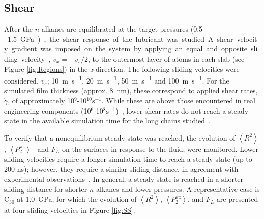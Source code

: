 \documentclass[5p]{elsarticle}
\begin{document}
\subsection{Shear}

After the $n$-alkanes are equilibrated at the target pressures (\SI{0.5}-\SI{1.5}{\giga\pascal}), the shear response of the lubricant was studied. A shear velocity gradient was imposed on the system by applying an equal and opposite sliding velocity, $v_x = \pm v_s/2$, to the outermost layer of atoms in each slab (see Figure \ref{fig:Regions}) in the \emph{x} direction. The following sliding velocities were considered, $v_s$; \SI{10}{\meter\per\second}, \SI{20}{\meter\per\second}, \SI{50}{\meter\per\second} and \SI{100}{\meter\per\second}. For the simulated film thickness (approx. \SI{8}{\nano\meter}), these correspond to applied shear rates, $\dot{\gamma}$, of approximately 10$^{9}$-10$^{10} \text{s}^{-1}$. While these are above those encountered in real engineering components (10$^{6}$-10$^{8} \text{s}^{-1}$)~\cite{Taylor2017}, lower shear rates do not reach a steady state in the available simulation time for the long chains studied~\cite{Ewen2018}.

To verify that a nonequilibrium steady state was reached, the evolution of $\left< R^2 \right>$, $\left<P_{2}^{xz} \right>$~\cite{Erman1985} and $F_L$ on the surfaces in response to the fluid, were monitored. Lower sliding velocities require a longer simulation time to reach a steady state (up to 200 ns); however, they require a similar sliding distance, in agreement with experimental observations~\cite{Drummond2000}. In general, a steady state is reached in a shorter sliding distance for shorter $n$-alkanes and lower pressures. A representative case is C$_{30}$ at \SI{1.0}{\giga\pascal}, for which the evolution of $\left< R^2 \right>$, $\left<P_{2}^{xz} \right>$, and $F_L$ are presented at four sliding velocities in Figure \ref{fig:SS}.
 
\end{document}
